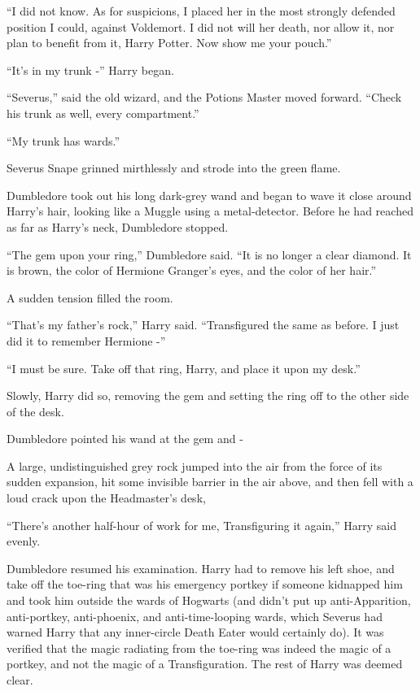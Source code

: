 ``I did not know. As for suspicions, I placed her in the most strongly
defended position I could, against Voldemort. I did not will her death,
nor allow it, nor plan to benefit from it, Harry Potter. Now show me
your pouch.''

``It's in my trunk -'' Harry began.

``Severus,'' said the old wizard, and the Potions Master moved forward.
``Check his trunk as well, every compartment.''

``My trunk has wards.''

Severus Snape grinned mirthlessly and strode into the green flame.

Dumbledore took out his long dark-grey wand and began to wave it close
around Harry's hair, looking like a Muggle using a metal-detector.
Before he had reached as far as Harry's neck, Dumbledore stopped.

``The gem upon your ring,'' Dumbledore said. ``It is no longer a clear
diamond. It is brown, the color of Hermione Granger's eyes, and the
color of her hair.''

A sudden tension filled the room.

``That's my father's rock,'' Harry said. ``Transfigured the same as
before. I just did it to remember Hermione -''

``I must be sure. Take off that ring, Harry, and place it upon my
desk.''

Slowly, Harry did so, removing the gem and setting the ring off to the
other side of the desk.

Dumbledore pointed his wand at the gem and -

A large, undistinguished grey rock jumped into the air from the force of
its sudden expansion, hit some invisible barrier in the air above, and
then fell with a loud crack upon the Headmaster's desk,

``There's another half-hour of work for me, Transfiguring it again,''
Harry said evenly.

Dumbledore resumed his examination. Harry had to remove his left shoe,
and take off the toe-ring that was his emergency portkey if someone
kidnapped him and took him outside the wards of Hogwarts (and didn't put
up anti-Apparition, anti-portkey, anti-phoenix, and anti-time-looping
wards, which Severus had warned Harry that any inner-circle Death Eater
would certainly do). It was verified that the magic radiating from the
toe-ring was indeed the magic of a portkey, and not the magic of a
Transfiguration. The rest of Harry was deemed clear.

